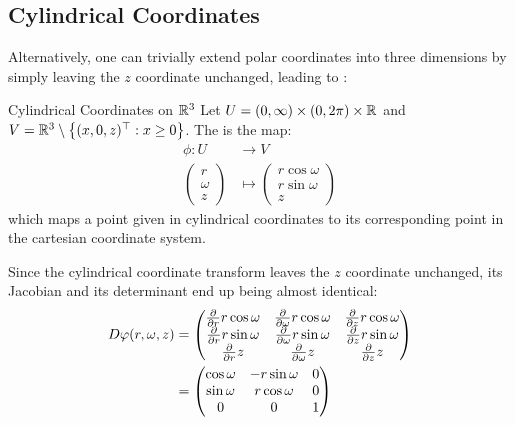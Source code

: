 \subsection{Cylindrical Coordinates}
Alternatively, one can trivially extend polar coordinates into three dimensions by simply leaving the $z$ coordinate unchanged, leading to :
\begin{importantdefinition}{Cylindrical Coordinates on $\mathbb{R}^3$}{}
	Let $U = (0,\infty) \times (0, 2\pi) \times \mathbb{R}$ and $V = \mathbb{R}^3 \setminus \qty{(x,0,z)^\top : x \geq 0}$. The  is the map:
	\begin{align*}
		\phi : 
		U &\to V\\
		\begin{pmatrix}
			r\\
			\omega\\
			z
		\end{pmatrix}
		&\mapsto
		\begin{pmatrix}
			r \cos \omega\\
			r \sin \omega\\
			z
		\end{pmatrix}
	\end{align*}
	which maps a point given in cylindrical coordinates to its corresponding point in the cartesian coordinate system. 
\end{importantdefinition}
Since the cylindrical coordinate transform leaves the $z$ coordinate unchanged, its
Jacobian and its determinant end up being almost identical:
\begin{align*}
	D\varphi(r,\omega,z)
	&=
	\begin{pmatrix}
		\pdv{r} r \cos \omega & \pdv{\omega} r \cos \omega & \pdv{z} r \cos \omega\\
		\pdv{r} r \sin \omega & \pdv{\omega} r \sin \omega & \pdv{z} r \sin \omega\\
		\pdv{r} z & \pdv{\omega} z & \pdv{z} z
	\end{pmatrix}
	\\
	&=
	\begin{pmatrix}
		\cos \omega & -r \sin \omega & 0\\
		\sin \omega & r \cos \omega & 0\\
		0 & 0 & 1
	\end{pmatrix}
\end{align*}

